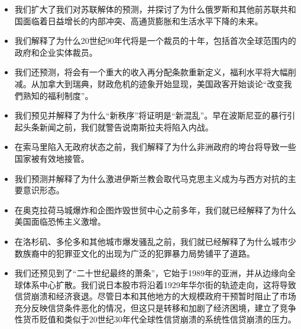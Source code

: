 \begin{paracol}{2}
	
	\switchcolumn
	\begin{itemize}
		\item 我们扩大了我们对苏联解体的预测，并探讨了为什么俄罗斯和其他前苏联共和国面临着日益增长的内部冲突、高通货膨胀和生活水平下降的未来。
		\item 我们解释了为什么20世纪90年代将是一个裁员的十年，包括首次全球范围内的政府和企业实体裁员。
		\item 我们还预测，将会有一个重大的收入再分配条款重新定义，福利水平将大幅削减。从加拿大到瑞典，财政危机的迹象开始显现，美国政客开始谈论“改变我們熟知的福利制度”。
		\item 我们预见并解释了为什么“新秩序”将证明是“新混乱”。早在波斯尼亚的暴行引起头条新闻之前，我们就警告说南斯拉夫将陷入内战。
		\item 在索马里陷入无政府状态之前，我们解释了为什么非洲政府的垮台将导致一些国家被有效地接管。
		\item 我们预测并解释了为什么激进伊斯兰教会取代马克思主义成为与西方对抗的主要意识形态。
		\item 在奥克拉荷马城爆炸和企图炸毁世贸中心之前多年，我们就已经解释了为什么美国面临恐怖主义激增。
		\item 在洛杉矶、多伦多和其他城市爆发骚乱之前，我们就已经解释了为什么城市少数族裔中的犯罪亚文化的出现为广泛的犯罪暴力局势铺平了道路。
		\item 我们还预见到了“二十世纪最终的萧条”，它始于1989年的亚洲，并从边缘向全球体系中心扩散。我们说日本股市将沿着1929年华尔街的轨迹走向，这将导致信贷崩溃和经济衰退。尽管日本和其他地方的大规模政府干预暂时阻止了市场充分反映信贷条件恶化的情况，但这只是转移和加剧了经济困境，建立了竞争性货币贬值和类似于20世纪30年代全球性信贷崩溃的系统性信贷崩溃的压力。
	\end{itemize}
	

\end{paracol}

